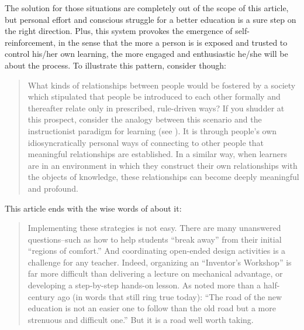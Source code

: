 The solution for those situations are completely out of the scope of this
article, but personal effort and conscious struggle for a better
education is a sure step on the right direction. Plus, this system provokes the
emergence of self-reinforcement, in the sense that the more a person is is
exposed and trusted to control his/her own learning, the more engaged and
enthusiastic he/she will be about the process. To illustrate this pattern,
consider \cite{education:wilensky_abstract_meditations_concrete} though: 
\clearpage%
\begin{quote} 
    What kinds of relationships between people would be fostered by a society
    which stipulated that people be introduced to each other formally and
    thereafter relate only in prescribed, rule-driven ways? If you shudder at
    this prospect, consider the analogy between this scenario and the
    instructionist paradigm for learning (see
    \cite{education:papert&harel_software_design_learning_enviroment}). It is
    through people's own idiosyncratically personal ways of connecting to other
    people that meaningful relationships are established. In a similar way, when
    learners are in an environment in which they construct their own
    relationships with the objects of knowledge, these relationships can become
    deeply meaningful and profound.   
\end{quote}


This article ends with the wise
words of \cite{education:resnick&ocko_learning_through_design} about it:

\begin{quote} 
    Implementing these strategies is not easy. There are many unanswered
    questions--such as how to help students ``break away'' from their initial
    ``regions of comfort.'' And coordinating open-ended design activities is a
    challenge for any teacher. Indeed, organizing an ``Inventor's Workshop'' is
    far more difficult than delivering a lecture on mechanical advantage, or
    developing a step-by-step hands-on lesson. As
    \cite{education:dewey_experience_education} noted more than a half-century
    ago (in words that still ring true today): ``The road of the new education
    is not an easier one to follow than the old road but a more strenuous and
    difficult one.'' But it is a road well worth taking. 
\end{quote}

